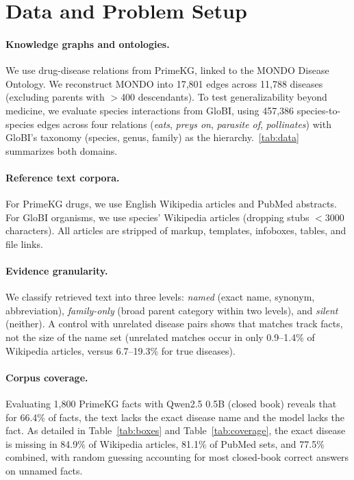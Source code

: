 % 


\section{Data and Problem Setup}

\paragraph{Knowledge graphs and ontologies.}
We use drug-disease relations from PrimeKG, linked to the MONDO Disease Ontology. We reconstruct MONDO into 17,801 edges across 11,788 diseases (excluding parents with $>$\num{400} descendants). To test generalizability beyond medicine, we evaluate species interactions from GloBI, using 457,386 species-to-species edges across four relations (\emph{eats}, \emph{preys on}, \emph{parasite of}, \emph{pollinates}) with GloBI's taxonomy (species, genus, family) as the hierarchy.~\cref{tab:data} summarizes both domains.



\paragraph{Reference text corpora.}
For PrimeKG drugs, we use English Wikipedia articles and PubMed abstracts. For GloBI organisms, we use species' Wikipedia articles (dropping stubs $<$\num{3000} characters). All articles are stripped of markup, templates, infoboxes, tables, and file links.

\paragraph{Evidence granularity.}
We classify retrieved text into three levels: \emph{named} (exact name, synonym, abbreviation), \emph{family-only} (broad parent category within two levels), and \emph{silent} (neither). A control with unrelated disease pairs shows that matches track facts, not the size of the name set (unrelated matches occur in only 0.9--1.4\% of Wikipedia articles, versus 6.7--19.3\% for true diseases).

\paragraph{Corpus coverage.}
Evaluating 1,800 PrimeKG facts with Qwen2.5 0.5B (closed book) reveals that for 66.4\% of facts, the text lacks the exact disease name and the model lacks the fact. As detailed in Table~\ref{tab:boxes} and Table~\ref{tab:coverage}, the exact disease is missing in 84.9\% of Wikipedia articles, 81.1\% of PubMed sets, and 77.5\% combined, with random guessing accounting for most closed-book correct answers on unnamed facts.

